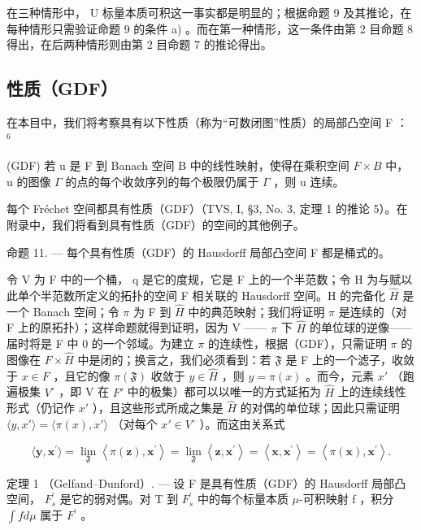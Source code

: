 在三种情形中， U 标量本质可积这一事实都是明显的；根据命题 9 及其推论，在每种情形只需验证命题 9 的条件 a) 。而在第一种情形，这一条件由第 2 目命题 8 得出，在后两种情形则由第 2 目命题 7 的推论得出。

\subsection{性质（GDF）}

在本目中，我们将考察具有以下性质（称为“可数闭图”性质）的局部凸空间 F ： \(^{6}\)

(GDF) 若 u 是 F 到 Banach 空间 B 中的线性映射，使得在乘积空间 \(F \times B\) 中， u 的图像 \(\Gamma\) 的点的每个收敛序列的每个极限仍属于 \(\Gamma\) ，则 u 连续。

每个 Fréchet 空间都具有性质（GDF）（TVS, I, §3, No. 3, 定理 1 的推论 5）。在附录中，我们将看到具有性质（GDF）的空间的其他例子。

命题 11. --- 每个具有性质（GDF）的 Hausdorff 局部凸空间 F 都是桶式的。

令 V 为 F 中的一个桶， q 是它的度规，它是 F 上的一个半范数；令 H 为与赋以此单个半范数所定义的拓扑的空间 F 相关联的 Hausdorff 空间。H 的完备化 \(\hat{H}\) 是一个 Banach 空间；令 \(\pi\) 为 F 到 \(\hat{H}\) 中的典范映射；我们将证明 \(\pi\) 是连续的（对 F 上的原拓扑）；这样命题就得到证明，因为 V —— \(\pi\) 下 \(\hat{H}\) 的单位球的逆像——届时将是 F 中 0 的一个邻域。为建立 \(\pi\) 的连续性，根据（GDF），只需证明 \(\pi\) 的图像在 \(F \times \hat{H}\) 中是闭的；换言之，我们必须看到：若 \(\mathfrak{F}\) 是 F 上的一个滤子，收敛于 \(x \in F\) ，且它的像 \(\pi(\mathfrak{F})\) 收敛于 \(y \in \hat{H}\) ，则 \(y = \pi(x)\) 。而今，元素 \(x'\) （跑遍极集 \(V^{\circ}\) ，即 V 在 \(F'\) 中的极集）都可以以唯一的方式延拓为 \(\hat{H}\) 上的连续线性形式（仍记作 \(x'\) ），且这些形式所成之集是 \(\hat{H}\) 的对偶的单位球；因此只需证明 \(\langle y, x' \rangle = \langle \pi(x), x' \rangle\) （对每个 \(x' \in V^{\circ}\) ）。而这由关系式

\[
\langle \mathbf {y}, \mathbf {x} ^ {\prime} \rangle = \lim _ {\mathfrak {F}} \left\langle \pi (\mathbf {z}), \mathbf {x} ^ {\prime} \right\rangle = \lim _ {\mathfrak {F}} \left\langle \mathbf {z}, \mathbf {x} ^ {\prime} \right\rangle = \left\langle \mathbf {x}, \mathbf {x} ^ {\prime} \right\rangle = \left\langle \pi (\mathbf {x}), \mathbf {x} ^ {\prime} \right\rangle .
\]

定理 1 （Gelfand--Dunford）. --- 设 F 是具有性质（GDF）的 Hausdorff 局部凸空间， \(F_{s}^{\prime}\) 是它的弱对偶。对 T 到 \(F_{s}^{\prime}\) 中的每个标量本质 \(\mu\)-可积映射 f ，积分 \(\int f d\mu\) 属于 \(F^{\prime}\) 。

